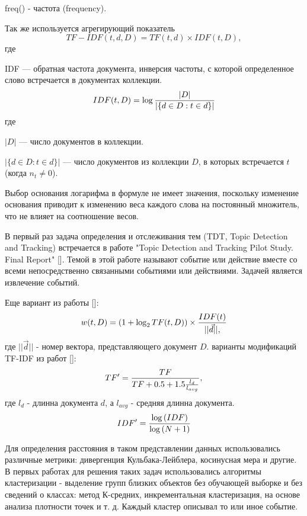 freq() - частота (frequency).

Так же используется агрегирующий показатель
\begin{equation}
TF-IDF(t,d,D)=TF(t,d) \times IDF(t,D),
\end{equation}
где

IDF — обратная частота документа, инверсия частоты, с которой определенное слово встречается в документах коллекции.
\begin{equation}
IDF(t,D)=\log{{|D|}\over{|\{ d \in D:t \in d \}|}}
\end{equation}
где

$|D|$ — число документов в коллекции.

$|\{ d \in D:t \in d \}|$ — число документов из коллекции  $D$, в которых встречается  $t$ (когда $n_t \neq 0$).

Выбор основания логарифма в формуле не имеет значения, поскольку изменение основания приводит к изменению веса каждого слова на постоянный множитель, что не влияет на соотношение весов.


В первый раз задача определения и отслеживания тем (TDT, Topic Detection and Tracking) встречается в работе 
"Topic Detection and Tracking Pilot Study. Final Report" [\todo{}]. Темой в этой работе называют событие или действие вместе со всеми непосредственно связанными событиями или действиями. Задачей является извлечение событий.

Еще вариант из работы [\todo{}]:
\begin{equation}
w(t,D)=(1+\log_2{TF(t,D)}) \times {{IDF(t)}\over{||\vec{d}||},}
\end{equation}
где $||\vec{d}||$ - номер вектора, представляющего документ $D$.
 варианты модификаций TF-IDF из работ [\todo{}]:
\begin{equation}
TF'={{TF}\over{TF+0.5+1.5{{l_d}\over{l_{avg}}}}},
\end{equation}
где $l_d$ - длинна документа $d$, а $l_{avg}$ - средняя длинна документа.
\begin{equation}
IDF'={{\log{(IDF)}}\over{\log{(N+1)}}}
\end{equation}

Для определения расстояния в таком представлении данных использовались различные метрики: дивергенция Кульбака-Лейблера, косинусная мера и другие. В первых работах для решения таких задач использовались алгоритмы кластеризации - выделение групп близких объектов без обучающей выборке и без сведений о классах: метод К-средних, инкрементальная кластеризация, на основе анализа плотности точек \cite{Klyshinskiy1} и т. д.  Каждый кластер описывал то или иное событие.

